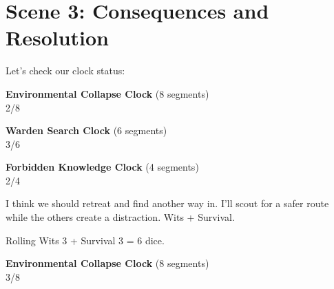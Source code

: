 \section*{Scene 3: Consequences and Resolution}

 Let's check our clock status:

\begin{center}
\textbf{Environmental Collapse Clock} (8 segments)\\
\fbox{\textcolor{clockcolor}{\clocksegment\clocksegment}\clocksegment\clocksegment\clocksegment\clocksegment\clocksegment\clocksegment} 2/8
\end{center}

\begin{center}
\textbf{Warden Search Clock} (6 segments)\\
\fbox{\textcolor{clockcolor}{\clocksegment\clocksegment\clocksegment}\clocksegment\clocksegment\clocksegment} 3/6
\end{center}

\begin{center}
\textbf{Forbidden Knowledge Clock} (4 segments)\\
\fbox{\textcolor{clockcolor}{\clocksegment\clocksegment}\clocksegment\clocksegment} 2/4
\end{center}


 I think we should retreat and find another way in. I'll scout for a safer route while the others create a distraction. Wits + Survival.


 Rolling Wits 3 + Survival 3 = 6 dice.   




\begin{center}
\textbf{Environmental Collapse Clock} (8 segments)\\
\fbox{\textcolor{clockcolor}{\clocksegment\clocksegment\clocksegment}\clocksegment\clocksegment\clocksegment\clocksegment\clocksegment} 3/8
\end{center}

